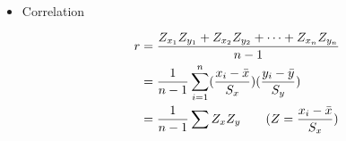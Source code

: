 \documentclass[Main.tex]{subfiles}
\begin{document}
	\begin{example} \hfill \\
		\begin{itemize}	
			\item Correlation\hfill
			\begin{definition}[Correlation]
				\begin{subequations}
					\begin{align}
						r&=\frac{Z_{x_{1}}Z_{y_{1}}+Z_{x_{2}}Z_{y_{2}}+\cdots+Z_{x_{n}}Z_{y_{n}}}{n-1}\\
						&=\frac{1}{n-1}\sum^{n}_{i=1}(\frac{x_{i}-\bar{x}}{S_{x}})(\frac{y_{i}-\bar{y}}{S_{y}})\\
						&=\frac{1}{n-1}\sum Z_{x}Z_{y} \qquad (Z=\frac{x_{i}-\bar{x}}{S_{x}})	\hfill	
					\end{align}
				\end{subequations}				
			\end{definition}\hfill 		
		\end{itemize}	
	\end{example}\hfill	
	
\end{document}
